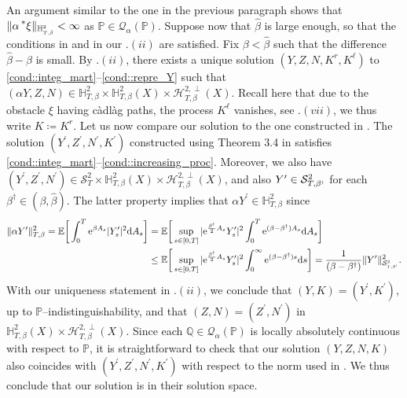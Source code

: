 \documentclass[10pt]{article} %
\newcommand\cH{\mathcal H}
\newcommand\cQ{\mathcal Q}
\newcommand\cS{\mathcal S}
\newcommand{\smalltext}[1]{\text{\fontsize{4}{4}\selectfont$#1$}}
\def \E{\mathbb{E}}
\def \H{\mathbb{H}}
\def \P{\mathbb{P}}
\def \Q{\mathbb{Q}}
\newcommand{\brs}[1]{\prescript{\ast}{}{#1}}
\newcommand{\1}{\mathbf{1}}
\def\d{\mathrm{d}}
\begin{document}
An argument similar to the one in the previous paragraph shows that $\|\alpha\brs{\xi}\|_{\H^\smalltext{2}_{\smalltext{T}\smalltext{,}\smalltext{\hat\beta}}} < \infty$ as $\P \in \cQ_\alpha(\P)$. Suppose now that $\hat\beta$ is large enough, so that the conditions in \cite[Theorem 3.9]{lin2020second} and in our .$(ii)$ are satisfied. Fix $\beta < \hat\beta$ such that the difference $\hat\beta-\beta$ is small. By .$(ii)$, there exists a unique solution $(Y,Z,N,K^r,K^\ell)$ to \ref{cond::integ_mart}--\ref{cond::repre_Y} such that $(\alpha Y,Z,N) \in \H^2_{T,\beta} \times \H^2_{T,\beta}(X) \times \cH^{2,\perp}_{T,\beta}(X)$. Recall here that due to the obstacle $\xi$ having c\`adl\`ag paths, the process $K^\ell$ vanishes, see .$(vii)$, we thus write $K \coloneqq K^r$. Let us now compare our solution to the one constructed in \cite{lin2020second}. The solution $(Y^\prime,Z^\prime,N^\prime,K^\prime)$ constructed using Theorem 3.4 in \cite{lin2020second} satisfies \ref{cond::integ_mart}--\ref{cond::increasing_proc}. Moreover, we also have $(Y^\prime,Z^\prime,N^\prime) \in \cS^2_T \times \H^2_{T,\beta}(X) \times \cH^{2,\perp}_{T,\beta}(X)$, and also $Y^\prime \in \cS^2_{T,\beta^\smalltext{\dag}}$ for each $\beta^\dag \in (\beta,\hat\beta)$. The latter property implies that $\alpha Y^\prime \in \H^2_{T,\beta}$ since
\begin{align*}
	\|\alpha Y^\prime\|^2_{T,\beta} = \E\bigg[\int_0^T \mathrm{e}^{\beta A_s} |Y^\prime_s|^2 \d A_s\bigg] &= \E\bigg[\sup_{s \in [0,T]}|\mathrm{e}^{\frac{\beta^\smalltext{\dag}}{2} A_s}Y^\prime_s|^2 \int_0^T \mathrm{e}^{(\beta-\beta^\dag)A_s} \d A_s\bigg] \\
	&\leq \E\bigg[\sup_{s \in [0,T]}|\mathrm{e}^{\frac{\beta^\smalltext{\dag}}{2} A_s}Y^\prime_s|^2 \int_0^\infty \mathrm{e}^{(\beta-\beta^\dag)s} \d s\bigg] = \frac{1}{(\beta-\beta^\dag)} \|Y^\prime\|^2_{\cS^\smalltext{2}_{\smalltext{T}\smalltext{,}\smalltext{\beta^\dag}}}.
\end{align*}
With our uniqueness statement in .$(ii)$, we conclude that $(Y,K) = (Y^\prime,K^\prime)$, up to $\P$--indistinguishability, and that $(Z,N) = (Z^\prime,N^\prime)$ in $\H^2_{T,\beta}(X) \times \cH^{2,\perp}_{T,\beta}(X)$. Since each $\Q \in \cQ_\alpha(\P)$ is locally absolutely continuous with respect to $\P$, it is straightforward to check that our solution $(Y,Z,N,K)$ also coincides with $(Y^\prime,Z^\prime,N^\prime,K^\prime)$ with respect to the norm used in \cite{lin2020second}. We thus conclude that our solution is in their solution space.
\end{document}
